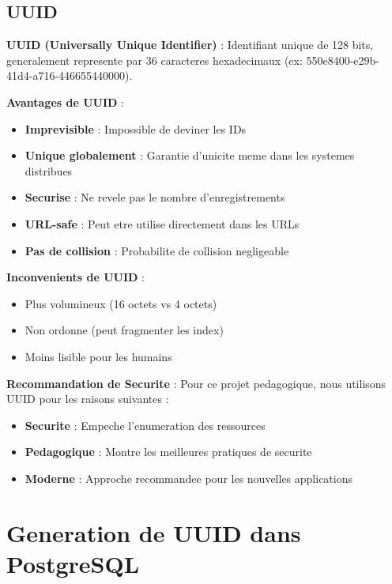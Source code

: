 \documentclass[a4paper,12pt]{book}
\begin{document}
\subsection{UUID}

\begin{definitionbox}
    \textbf{UUID (Universally Unique Identifier)} : Identifiant unique de 128 bits, generalement represente par 36 caracteres hexadecimaux (ex: 550e8400-e29b-41d4-a716-446655440000).
\end{definitionbox}

\textbf{Avantages de UUID} :
\begin{itemize}
    \item \textbf{Imprevisible} : Impossible de deviner les IDs
    \item \textbf{Unique globalement} : Garantie d'unicite meme dans les systemes distribues
    \item \textbf{Securise} : Ne revele pas le nombre d'enregistrements
    \item \textbf{URL-safe} : Peut etre utilise directement dans les URLs
    \item \textbf{Pas de collision} : Probabilite de collision negligeable
\end{itemize}

\textbf{Inconvenients de UUID} :
\begin{itemize}
    \item Plus volumineux (16 octets vs 4 octets)
    \item Non ordonne (peut fragmenter les index)
    \item Moins lisible pour les humains
\end{itemize}

\begin{securitybox}
    \textbf{Recommandation de Securite} :
    Pour ce projet pedagogique, nous utilisons UUID pour les raisons suivantes :
    \begin{itemize}
        \item \textbf{Securite} : Empeche l'enumeration des ressources
        \item \textbf{Pedagogique} : Montre les meilleures pratiques de securite
        \item \textbf{Moderne} : Approche recommandee pour les nouvelles applications
    \end{itemize}
\end{securitybox}

\section{Generation de UUID dans PostgreSQL}
\end{document}
